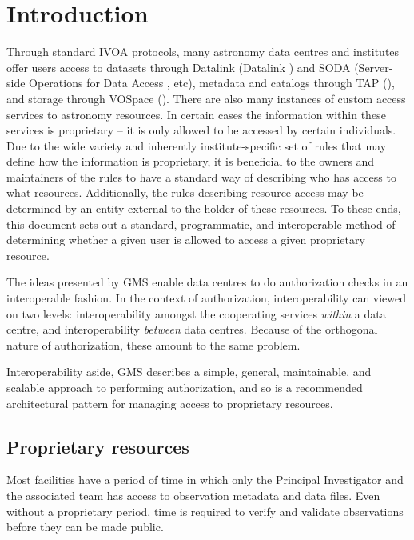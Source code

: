 \documentclass[11pt,a4paper]{ivoa}
\begin{document}
\section{Introduction}

Through standard IVOA protocols, many astronomy data centres and institutes offer users access to datasets through Datalink (Datalink \citep{2015ivoa.spec.0617D}) and SODA (Server-side Operations for Data Access \citep{2017ivoa.spec.0517B}, etc), metadata and catalogs through TAP (\citep{2010ivoa.spec.0327D}), and storage through VOSpace (\citep{2018ivoa.spec.0621G}).  There are also many instances of custom access services to astronomy resources.  In certain cases the information within these services is proprietary -- it is only allowed to be accessed by certain individuals.  Due to the wide variety and inherently institute-specific set of rules that may define how the information is proprietary, it is beneficial to the owners and maintainers of the rules to have a standard way of describing who has access to what resources.  Additionally, the rules describing resource access may be determined by an entity external to the holder of these resources.  To these ends, this document sets out a standard, programmatic, and interoperable method of determining whether a given user is allowed to access a given proprietary resource.

The ideas presented by GMS enable data centres to do authorization checks in an interoperable fashion.  In the context of authorization, interoperability can viewed on two levels:  interoperability amongst the cooperating services \emph{within} a data centre, and interoperability \emph{between} data centres.  Because of the orthogonal nature of authorization, these amount to the same problem.

Interoperability aside, GMS describes a simple, general, maintainable, and scalable approach to performing authorization, and so is a recommended architectural pattern for managing access to proprietary resources.

\subsection{Proprietary resources}
\label{subsec:propresources}

Most facilities have a period of time in which only the Principal Investigator and the associated team has access to observation metadata and data files.  Even without a proprietary period, time is required to verify and validate observations before they can be made public.
\end{document}
